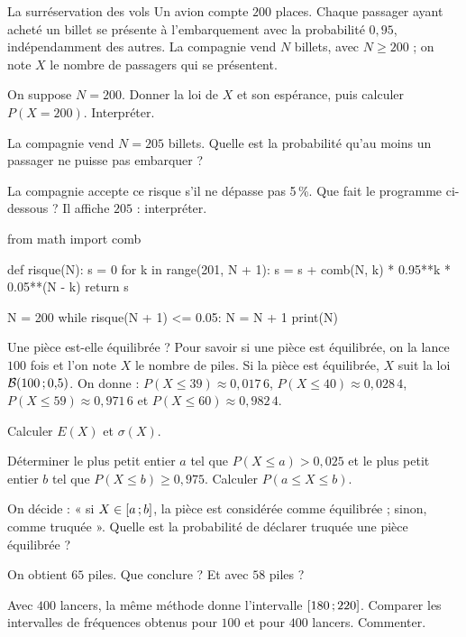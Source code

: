\begin{exercice}[3]{La surréservation des vols}
Un avion compte $200$ places. Chaque passager ayant acheté un billet se présente à l'embarquement avec la probabilité $0{,}95$,
indépendamment des autres. La compagnie vend $N$ billets, avec $N\geq200$ ; on note $X$ le nombre de passagers qui se présentent.
\begin{questions}
  \item On suppose $N=200$. Donner la loi de $X$ et son espérance, puis calculer $P(X=200)$. Interpréter.
  \item La compagnie vend $N=205$ billets. Quelle est la probabilité qu'au moins un passager ne puisse pas embarquer ?
  \item La compagnie accepte ce risque s'il ne dépasse pas 5\,\%. Que fait le programme ci-dessous ? Il affiche $205$ : interpréter.
\begin{python}
from math import comb

def risque(N):
    s = 0
    for k in range(201, N + 1):
        s = s + comb(N, k) * 0.95**k * 0.05**(N - k)
    return s

N = 200
while risque(N + 1) <= 0.05:
    N = N + 1
print(N)
\end{python}
\end{questions}
\end{exercice}

\begin{exercice}[3]{Une pièce est-elle équilibrée ?}
Pour savoir si une pièce est équilibrée, on la lance $100$ fois et l'on note $X$ le nombre de piles. Si la pièce est équilibrée,
$X$ suit la loi $\mathcal{B}(100\,{;}\,0{,}5)$. On donne : $P(X\leq39)\approx0{,}017\,6$, $P(X\leq40)\approx0{,}028\,4$,
$P(X\leq59)\approx0{,}971\,6$ et $P(X\leq60)\approx0{,}982\,4$.
\begin{questions}
  \item Calculer $E(X)$ et $\sigma(X)$.
  \item Déterminer le plus petit entier $a$ tel que $P(X\leq a)>0{,}025$ et le plus petit entier $b$ tel que $P(X\leq b)\geq0{,}975$.
    Calculer $P(a\leq X\leq b)$.
  \item On décide : « si $X\in\mathopen{[}a\,{;}\,b\mathclose{]}$, la pièce est considérée comme équilibrée ; sinon, comme truquée ». Quelle est la
    probabilité de déclarer truquée une pièce équilibrée ?
  \item On obtient $65$ piles. Que conclure ? Et avec $58$ piles ?
  \item Avec $400$ lancers, la même méthode donne l'intervalle $\mathopen{[}180\,{;}\,220\mathclose{]}$. Comparer les intervalles de fréquences
    obtenus pour $100$ et pour $400$ lancers. Commenter.
\end{questions}
\end{exercice}
